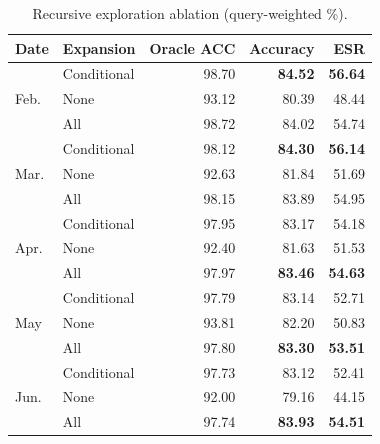 \begin{table}[t]
\centering
\caption{Recursive exploration ablation (query-weighted \%).}
\label{tab:ablation_recursion}
\footnotesize
\setlength{\tabcolsep}{3pt}
\renewcommand{\arraystretch}{1.08}
\begin{tabular*}{\columnwidth}{@{\extracolsep{\fill}}llrrr@{}}
\toprule
Date & Expansion & Oracle ACC & Accuracy & ESR\\
\midrule
\multirow{3}{*}{Feb.} & Conditional & 98.70 & \textbf{84.52} & \textbf{56.64}\\
 & None & 93.12 & 80.39 & 48.44\\
 & All & 98.72 & 84.02 & 54.74\\
\midrule
\multirow{3}{*}{Mar.} & Conditional & 98.12 & \textbf{84.30} & \textbf{56.14}\\
 & None & 92.63 & 81.84 & 51.69\\
 & All & 98.15 & 83.89 & 54.95\\
\midrule
\multirow{3}{*}{Apr.} & Conditional & 97.95 & 83.17 & 54.18\\
 & None & 92.40 & 81.63 & 51.53\\
 & All & 97.97 & \textbf{83.46} & \textbf{54.63}\\
\midrule
\multirow{3}{*}{May} & Conditional & 97.79 & 83.14 & 52.71\\
 & None & 93.81 & 82.20 & 50.83\\
 & All & 97.80 & \textbf{83.30} & \textbf{53.51}\\
\midrule
\multirow{3}{*}{Jun.} & Conditional & 97.73 & 83.12 & 52.41\\
 & None & 92.00 & 79.16 & 44.15\\
 & All & 97.74 & \textbf{83.93} & \textbf{54.51}\\
\bottomrule
\end{tabular*}
\end{table}
